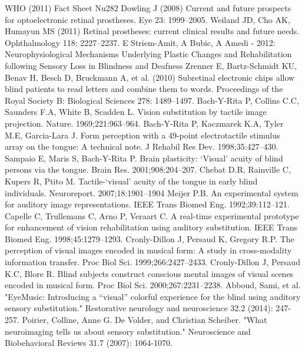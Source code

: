 \documentclass{article}
\begin{document}
\begin{thebibliography}{9}

  WHO (2011) Fact Sheet Nu282
Dowling J (2008) Current and future prospects for optoelectronic retinal prostheses. Eye 23: 1999–2005.
Weiland JD, Cho AK, Humayun MS (2011) Retinal prostheses: current clinical results and future needs. Ophthalmology 118: 2227–2237.
E Striem-Amit, A Bubic, A Amedi - 2012: Neurophysiological Mechanisms Underlying Plastic Changes and Rehabilitation following Sensory Loss in Blindness and Deafness
Zrenner E, Bartz-Schmidt KU, Benav H, Besch D, Bruckmann A, et al. (2010) Subretinal electronic chips allow blind patients to read letters and combine them to words. Proceedings of the Royal Society B: Biological Sciences 278: 1489–1497.
Bach-Y-Rita P, Collins C.C, Saunders F.A, White B, Scadden L. Vision substitution by tactile image projection. Nature. 1969;221:963–964. 
Bach-Y-Rita P, Kaczmarek K.A, Tyler M.E, Garcia-Lara J. Form perception with a 49-point electrotactile stimulus array on the tongue: A technical note. J Rehabil Res Dev. 1998;35:427–430.
Sampaio E, Maris S, Bach-Y-Rita P. Brain plasticity: ‘Visual’ acuity of blind persons via the tongue. Brain Res. 2001;908:204–207. 
Chebat D.R, Rainville C, Kupers R, Ptito M. Tactile-‘visual’ acuity of the tongue in early blind individuals. Neuroreport. 2007;18:1901–1904
Meijer P.B. An experimental system for auditory image representations. IEEE Trans Biomed Eng. 1992;39:112–121.
Capelle C, Trullemans C, Arno P, Veraart C. A real-time experimental prototype for enhancement of vision rehabilitation using auditory substitution. IEEE Trans Biomed Eng. 1998;45:1279–1293. 
Cronly-Dillon J, Persaud K, Gregory R.P. The perception of visual images encoded in musical form: A study in cross-modality information transfer. Proc Biol Sci. 1999;266:2427–2433. 
Cronly-Dillon J, Persaud K.C, Blore R. Blind subjects construct conscious mental images of visual scenes encoded in musical form. Proc Biol Sci. 2000;267:2231–2238.
Abboud, Sami, et al. "EyeMusic: Introducing a “visual” colorful experience for the blind using auditory sensory substitution." Restorative neurology and neuroscience 32.2 (2014): 247-257.
Poirier, Colline, Anne G. De Volder, and Christian Scheiber. "What neuroimaging tells us about sensory substitution." Neuroscience and Biobehavioral Reviews 31.7 (2007): 1064-1070.

\end{thebibliography}
\end{document}
